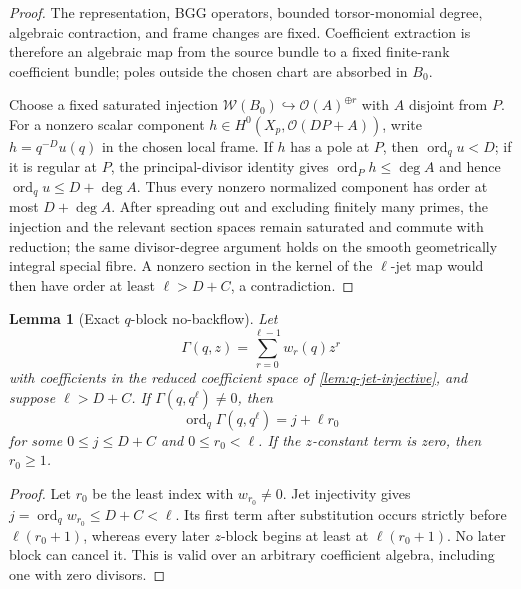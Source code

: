 \documentclass[11pt]{article}
\newtheorem{lemma}[lemma]{Lemma}
\theoremstyle{definition}
\theoremstyle{remark}
\newcommand{\ord}{\operatorname{ord}}
\newcommand{\calW}{\mathcal W}
\newcommand{\calO}{\mathcal O}
\begin{document}
\begin{proof}
The representation, BGG operators, bounded torsor-monomial degree, algebraic
contraction, and frame changes are fixed.  Coefficient extraction is therefore
an algebraic map from the source bundle to a fixed finite-rank coefficient
bundle; poles outside the chosen chart are absorbed in $B_0$.

Choose a fixed saturated injection
$\calW(B_0)\hookrightarrow\calO(A)^{\oplus r}$ with $A$ disjoint from $P$.
For a nonzero scalar component $h\in H^0(X_p,\calO(DP+A))$, write
$h=q^{-D}u(q)$ in the chosen local frame.  If $h$ has a pole at $P$, then
$\ord_qu<D$; if it is regular at $P$, the principal-divisor identity gives
$\ord_Ph\le\deg A$ and hence $\ord_qu\le D+\deg A$.  Thus every nonzero
normalized component has order at most $D+\deg A$.  After spreading out
and excluding finitely many primes, the injection and the relevant section
spaces remain saturated and commute with reduction; the same divisor-degree
argument holds on the smooth geometrically integral special fibre.  A
nonzero section in the kernel of the $\ell$-jet map would then have order at
least $\ell>D+C$, a contradiction.
\end{proof}

\begin{lemma}[Exact $q$-block no-backflow]
\label{lem:q-block}
Let
\[
 \Gamma(q,z)=\sum_{r=0}^{\ell-1}w_r(q)z^r
\]
with coefficients in the reduced coefficient space of
\cref{lem:q-jet-injective}, and suppose $\ell>D+C$.  If
$\Gamma(q,q^\ell)\ne0$, then
\[
 \ord_q\Gamma(q,q^\ell)=j+\ell r_0
\]
for some $0\le j\le D+C$ and $0\le r_0<\ell$.  If the $z$-constant term is
zero, then $r_0\ge1$.
\end{lemma}

\begin{proof}
Let $r_0$ be the least index with $w_{r_0}\ne0$.  Jet injectivity gives
$j=\ord_qw_{r_0}\le D+C<\ell$.  Its first term after substitution occurs
strictly before $\ell(r_0+1)$, whereas every later $z$-block begins at least
at $\ell(r_0+1)$.  No later block can cancel it.  This is valid over an
arbitrary coefficient algebra, including one with zero divisors.
\end{proof}
\end{document}
